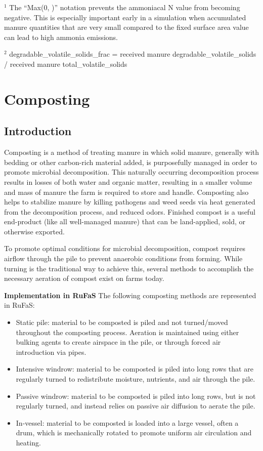 \begin{refsection}
{\footnotesize
\noindent
\(^1\) The “Max(0, )” notation prevents the ammoniacal N value from becoming negative. This is especially important early in a simulation when accumulated manure quantities that are very small compared to the fixed surface area value can lead to high ammonia emissions. \par
\noindent
\(^2\) degradable\_volatile\_solids\_frac = received manure degradable\_volatile\_solids / received manure total\_volatile\_solids
}




 
\newpage
\section{Composting}
 
\subsection{Introduction} Composting is a method of treating manure in which solid manure, generally with bedding or other carbon-rich material added, is purposefully managed in order to promote microbial decomposition. This naturally occurring decomposition process results in losses of both water and organic matter, resulting in a smaller volume and mass of manure the farm is required to store and handle. Composting also helps to stabilize manure by killing pathogens and weed seeds via heat generated from the decomposition process, and reduced odors. Finished compost is a useful end-product (like all well-managed manure) that can be land-applied, sold, or otherwise exported. 
    
    To promote optimal conditions for microbial decomposition, compost requires airflow through the pile to prevent anaerobic conditions from forming. While turning is the traditional way to achieve this, several methods to accomplish the necessary aeration of compost exist on farms today.
\vspace{0.5cm}

    \textbf{Implementation in RuFaS}
    The following composting methods are represented in RuFaS:
    \begin{itemize}
        \item Static pile: material to be composted is piled and not turned/moved throughout the composting process. Aeration is maintained using either bulking agents to create airspace in the pile, or through forced air introduction via pipes.
        \item Intensive windrow: material to be composted is piled into long rows that are regularly turned to redistribute moisture, nutrients, and air through the pile.
        \item Passive windrow: material to be composted is piled into long rows, but is not regularly turned, and instead relies on passive air diffusion to aerate the pile.
        \item In-vessel: material to be composted is loaded into a large vessel, often a drum, which is mechanically rotated to promote uniform air circulation and heating.
    \end{itemize}


\end{refsection}
